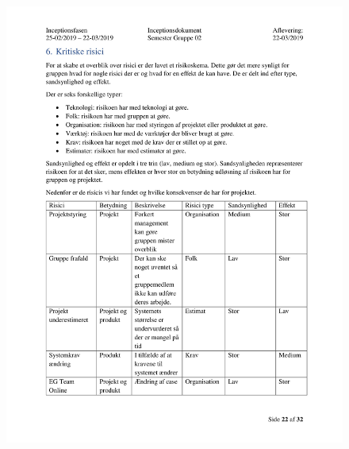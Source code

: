 \begin{figure}[hb]
  \includegraphics[scale = 0.33]{./PNG/Inceptions/Gruppe02+InceptionsDokument-23.jpg} 
\end{figure}

